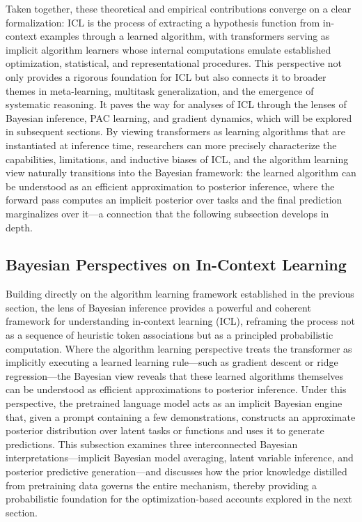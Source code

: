 \documentclass[11pt]{article}
\begin{document}
Taken together, these theoretical and empirical contributions converge on a clear formalization: ICL is the process of extracting a hypothesis function from in-context examples through a learned algorithm, with transformers serving as implicit algorithm learners whose internal computations emulate established optimization, statistical, and representational procedures. This perspective not only provides a rigorous foundation for ICL but also connects it to broader themes in meta-learning, multitask generalization, and the emergence of systematic reasoning. It paves the way for analyses of ICL through the lenses of Bayesian inference, PAC learning, and gradient dynamics, which will be explored in subsequent sections. By viewing transformers as learning algorithms that are instantiated at inference time, researchers can more precisely characterize the capabilities, limitations, and inductive biases of ICL, and the algorithm learning view naturally transitions into the Bayesian framework: the learned algorithm can be understood as an efficient approximation to posterior inference, where the forward pass computes an implicit posterior over tasks and the final prediction marginalizes over it---a connection that the following subsection develops in depth.

\subsection{Bayesian Perspectives on In-Context Learning}

Building directly on the algorithm learning framework established in the previous section, the lens of Bayesian inference provides a powerful and coherent framework for understanding in-context learning (ICL), reframing the process not as a sequence of heuristic token associations but as a principled probabilistic computation. Where the algorithm learning perspective treats the transformer as implicitly executing a learned learning rule---such as gradient descent or ridge regression---the Bayesian view reveals that these learned algorithms themselves can be understood as efficient approximations to posterior inference. Under this perspective, the pretrained language model acts as an implicit Bayesian engine that, given a prompt containing a few demonstrations, constructs an approximate posterior distribution over latent tasks or functions and uses it to generate predictions. This subsection examines three interconnected Bayesian interpretations---implicit Bayesian model averaging, latent variable inference, and posterior predictive generation---and discusses how the prior knowledge distilled from pretraining data governs the entire mechanism, thereby providing a probabilistic foundation for the optimization-based accounts explored in the next section.
\end{document}
